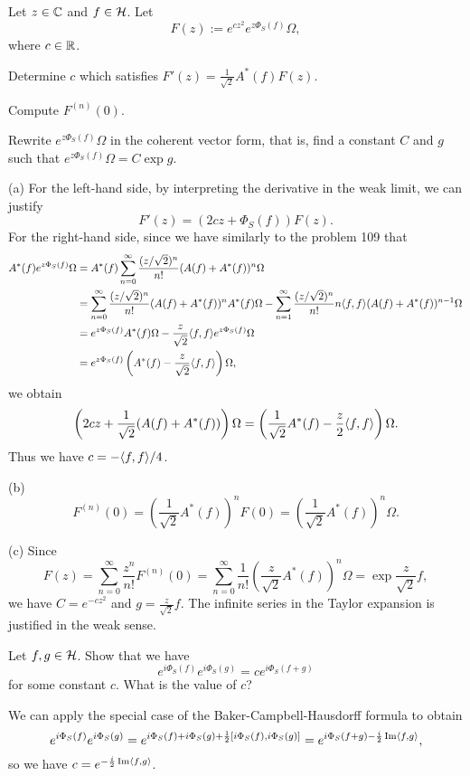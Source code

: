 \documentclass{../../../small}
\begin{document}
\begin{prb}
Let $z\in\mathbb{C}$ and $f\in\mathcal{H}$.
Let 
\[F(z):=e^{cz^2}e^{z\Phi_S(f)}\Omega,\]
where $c\in\mathbb{R}$.
\begin{parts}
\item Determine $c$ which satisfies $F'(z)=\frac1{\sqrt2}A^*(f)F(z)$.
\item Compute $F^{(n)}(0)$.
\item Rewrite $e^{z\Phi_S(f)}\Omega$ in the coherent vector form, that is, find a constant $C$ and $g$ such that $e^{z\Phi_S(f)}\Omega=C\exp g$.
\end{parts}
\end{prb}
\begin{sol}
(a)
For the left-hand side, by interpreting the derivative in the weak limit, we can justify
\[F'(z)=(2cz+\Phi_S(f))F(z).\]
For the right-hand side, since we have similarly to the problem 109 that
\begin{align*}
A^*(f)e^{z\Phi_S(f)}\Omega
&=A^*(f)\sum_{n=0}^\infty\frac{(z/\sqrt2)^n}{n!}(A(f)+A^*(f))^n\Omega\\
&=\sum_{n=0}^\infty\frac{(z/\sqrt2)^n}{n!}(A(f)+A^*(f))^nA^*(f)\Omega
-\sum_{n=1}^\infty\frac{(z/\sqrt2)^n}{n!}n\langle f,f\rangle(A(f)+A^*(f))^{n-1}\Omega\\
&=e^{z\Phi_S(f)}A^*(f)\Omega-\frac z{\sqrt2}\langle f,f\rangle e^{z\Phi_S(f)}\Omega\\
&=e^{z\Phi_S(f)}\left(A^*(f)-\frac z{\sqrt2}\langle f,f\rangle\right)\Omega,
\end{align*}
we obtain
\[\left(2cz+\frac1{\sqrt2}(A(f)+A^*(f))\right)\Omega=\left(\frac1{\sqrt2}A^*(f)-\frac z2\langle f,f\rangle\right)\Omega.\]
Thus we have $c=-\langle f,f\rangle/4$.

(b)
\[F^{(n)}(0)=\left(\frac1{\sqrt2}A^*(f)\right)^nF(0)=\left(\frac1{\sqrt2}A^*(f)\right)^n\Omega.\]

(c)
Since
\[F(z)=\sum_{n=0}^\infty\frac{z^n}{n!}F^{(n)}(0)=\sum_{n=0}^\infty\frac1{n!}\left(\frac z{\sqrt2}A^*(f)\right)^n\Omega=\exp\frac z{\sqrt2}f,\]
we have $C=e^{-cz^2}$ and $g=\frac z{\sqrt2}f$.
The infinite series in the Taylor expansion is justified in the weak sense.
\end{sol}

\begin{prb}
Let $f,g\in\mathcal{H}$.
Show that we have
\[e^{i\Phi_S(f)}e^{i\Phi_S(g)}=ce^{i\Phi_S(f+g)}\]
for some constant $c$.
What is the value of $c$?
\end{prb}
\begin{sol}
We can apply the special case of the Baker-Campbell-Hausdorff formula to obtain
\[e^{i\Phi_S(f)}e^{i\Phi_S(g)}=e^{i\Phi_S(f)+i\Phi_S(g)+\frac12[i\Phi_S(f),i\Phi_S(g)]}=e^{i\Phi_S(f+g)-\frac i2\operatorname{Im}\langle f,g\rangle},\]
so we have $c=e^{-\frac i2\operatorname{Im}\langle f,g\rangle}$.
\end{sol}
\end{document}
